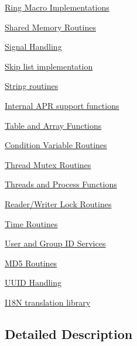 \begin{DoxyCompactItemize}
\item 
\hyperlink{group__apr__ring}{Ring Macro Implementations}
\item 
\hyperlink{group__apr__shm}{Shared Memory Routines}
\item 
\hyperlink{group__apr__signal}{Signal Handling}
\item 
\hyperlink{group__apr__skiplist}{Skip list implementation}
\item 
\hyperlink{group__apr__strings}{String routines}
\item 
\hyperlink{group__apr__support}{Internal A\+P\+R support functions}
\item 
\hyperlink{group__apr__tables}{Table and Array Functions}
\item 
\hyperlink{group__apr__thread__cond}{Condition Variable Routines}
\item 
\hyperlink{group__apr__thread__mutex}{Thread Mutex Routines}
\item 
\hyperlink{group__apr__thread__proc}{Threads and Process Functions}
\item 
\hyperlink{group__apr__thread__rwlock}{Reader/\+Writer Lock Routines}
\item 
\hyperlink{group__apr__time}{Time Routines}
\item 
\hyperlink{group__apr__user}{User and Group I\+D Services}
\item 
\hyperlink{group__APR__MD5}{M\+D5 Routines}
\item 
\hyperlink{group__APR__UUID}{U\+U\+I\+D Handling}
\item 
\hyperlink{group__APR__XLATE}{I18\+N translation library}
\end{DoxyCompactItemize}


\subsection{Detailed Description}
